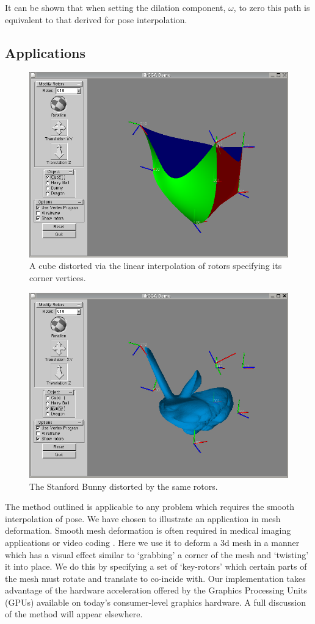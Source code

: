 It can be shown \cite{jic23fyr} that when setting the dilation component,
$\omega$, to zero this path is equivalent to that derived for pose
interpolation.

\subsection{Applications}

\begin{figure}[p]
\centering
\includegraphics[width=0.7\columnwidth]{distorted_cube}
\caption{\label{fig:distorted_cube}%
  A cube distorted via the linear interpolation of rotors specifying its
  corner vertices.
}
\end{figure}

\begin{figure}[p]
\centering
\includegraphics[width=0.7\columnwidth]{distorted_bunny}
\caption{\label{fig:distorted_bunny}%
  The Stanford Bunny\cite{bunny} distorted by the same rotors.
}
\end{figure}

The method outlined is applicable to any problem which requires the smooth
interpolation of pose. We have chosen to illustrate an application in
mesh deformation. Smooth mesh deformation is often required in medical 
imaging applications \cite{ACM:614422} or video coding \cite{ACM:704422}.
Here we use it to deform a 3d mesh in a manner which has a visual effect
similar to `grabbing' a corner of the mesh and `twisting' it into place.
We do this by specifying a set of `key-rotors' which certain parts of the
mesh must rotate and translate to co-incide with. Our implementation takes
advantage of the hardware acceleration offered by the Graphics
Processing Units (GPUs) available on today's consumer-level graphics 
hardware. A full discussion of the method will appear elsewhere.

